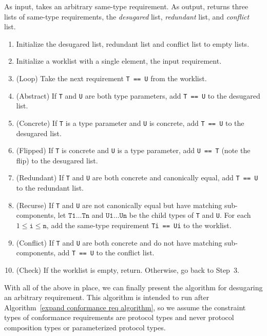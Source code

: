\documentclass[../generics]{subfiles}
\begin{document}
\begin{algorithm}\label{desugar same type algo} As input, takes an arbitrary same-type requirement. As output, returns three lists of same-type requirements, the \emph{desugared} list, \emph{redundant} list, and \emph{conflict} list.
\begin{enumerate}
\item Initialize the desugared list, redundant list and conflict list to empty lists.
\item Initialize a worklist with a single element, the input requirement.
\item (Loop) Take the next requirement \texttt{T == U} from the worklist.
\item (Abstract) If \texttt{T} and \texttt{U} are both type parameters, add \texttt{T == U} to the desugared list.
\item (Concrete) If \texttt{T} is a type parameter and \texttt{U} is concrete, add \texttt{T == U} to the desugared list.
\item (Flipped) If \texttt{T} is concrete and \texttt{U} is a type parameter, add \texttt{U == T} (note the flip) to the desugared list.
\item (Redundant) If \texttt{T} and \texttt{U} are both concrete and canonically equal, add \texttt{T == U} to the redundant list.
\item (Recurse) If \texttt{T} and \texttt{U} are not canonically equal but have matching sub-components, let $\texttt{T1}\ldots\texttt{Tn}$ and $\texttt{U1}\ldots\texttt{Un}$ be the child types of \texttt{T} and \texttt{U}. For each $1\le \texttt{i}\le \texttt{n}$, add the same-type requirement \texttt{Ti == Ui} to the worklist.
\item (Conflict) If \texttt{T} and \texttt{U} are both concrete and do not have matching sub-components, add \texttt{T == U} to the conflict list.
\item (Check) If the worklist is empty, return. Otherwise, go back to Step~3.
\end{enumerate}
\end{algorithm}
With all of the above in place, we can finally present the algorithm for desugaring an arbitrary requirement. This algorithm is intended to run after Algorithm~\ref{expand conformance req algorithm}, so we assume the constraint types of conformance requirements are protocol types and never protocol composition types or parameterized protocol types.
\end{document}
